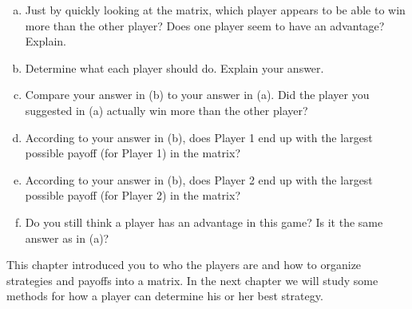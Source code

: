 \begin{xca}
\begin{enumerate}[(a)]
\item Just by quickly looking at the matrix, which player appears to be able to win more than the other player? Does one player seem to have an advantage? Explain.
\item Determine what each player should do. Explain your answer.
\item Compare your answer in (b) to your answer in (a). Did the player you suggested in (a) actually win more than the other player?
\item According to your answer in (b), does Player 1 end up with the largest possible payoff (for Player 1) in the matrix?
\item According to your answer in (b), does Player 2 end up with the largest possible payoff (for Player 2) in the matrix?
\item Do you still think a player has an advantage in this game? Is it the same answer as in (a)?
\end{enumerate}
\end{xca}

\vspace{.5in}

This chapter introduced you to who the players are and how to organize strategies and payoffs into a matrix. In the next chapter we will study some methods for how a player can determine his or her best strategy.


 
